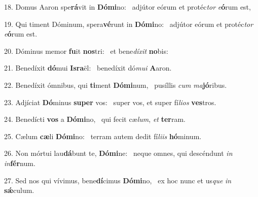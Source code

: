 18. Domus Aaron spe\textbf{rá}vit in \textbf{Dó}\textbf{mi}no: \ast\  adjútor eórum et protéc\textit{tor} \textit{e}\textbf{ó}rum est,\

19. Qui timent Dóminum, spera\textbf{vé}runt in \textbf{Dó}\textbf{mi}no: \ast\  adjútor eórum et protéc\textit{tor} \textit{e}\textbf{ó}rum est.\

20. Dóminus memor \textbf{fu}it \textbf{nos}tri: \ast\  et bene\textit{dí}\textit{xit} \textbf{no}bis:\

21. Benedíxit \textbf{dó}mui \textbf{Is}\textbf{ra}ël: \ast\  benedíxit dó\textit{mu}\textit{i} \textbf{A}aron.\

22. Benedíxit ómnibus, qui \textbf{ti}ment \textbf{Dó}\textbf{mi}num, \ast\  pusíllis \textit{cum} \textit{ma}\textbf{jó}ribus.\

23. Adjíciat \textbf{Dó}minus \textbf{su}\textbf{per} vos: \ast\  super vos, et super fí\textit{li}\textit{os} \textbf{ves}tros.\

24. Benedícti \textbf{vos} a \textbf{Dó}\textbf{mi}no, \ast\  qui fecit cæ\textit{lum}, \textit{et} \textbf{ter}ram.\

25. Cælum \textbf{cæ}li \textbf{Dó}\textbf{mi}no: \ast\  terram autem dedit fí\textit{li}\textit{is} \textbf{hó}minum.\

26. Non mórtui lau\textbf{dá}bunt te, \textbf{Dó}\textbf{mi}ne: \ast\  neque omnes, qui descéndunt \textit{in} \textit{in}\textbf{fér}num.\

27. Sed nos qui vívimus, bene\textbf{dí}cimus \textbf{Dó}\textbf{mi}no, \ast\  ex hoc nunc et us\textit{que} \textit{in} \textbf{sǽ}culum.\

